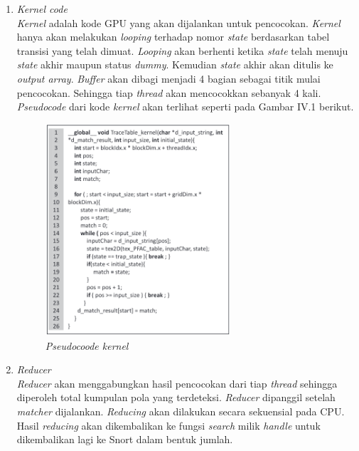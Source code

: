 \begin{enumerate}
      \item
      \emph{Kernel code} \\
      \emph{Kernel} adalah kode GPU yang akan dijalankan untuk pencocokan. \emph{Kernel} hanya akan melakukan \emph{looping} terhadap nomor \emph{state} berdasarkan tabel transisi yang telah dimuat. \emph{Looping} akan berhenti ketika \emph{state} telah menuju \emph{state} akhir maupun status \emph{dummy}. Kemudian \emph{state} akhir akan ditulis ke \emph{output array}. \emph{Buffer} akan dibagi menjadi 4 bagian sebagai titik mulai pencocokan. Sehingga tiap \emph{thread} akan mencocokkan sebanyak 4 kali. \emph{Pseudocode} dari kode \emph{kernel} akan terlihat seperti pada Gambar IV.1 berikut.

      \begin{figure}[htb]
        \centering
        \includegraphics[width=0.65\textwidth]{resources/pseudo.png}
        \caption[\emph{Pseudocoode kernel}]{\emph{Pseudocoode kernel}}
      \end{figure}

      \item
      \emph{Reducer} \\
      \emph{Reducer} akan menggabungkan hasil pencocokan dari tiap \emph{thread} sehingga diperoleh total kumpulan pola yang terdeteksi. \emph{Reducer} dipanggil setelah \emph{matcher} dijalankan. \emph{Reducing} akan dilakukan secara sekuensial pada CPU. Hasil \emph{reducing} akan dikembalikan ke fungsi \emph{search} milik \emph{handle} untuk dikembalikan lagi ke Snort dalam bentuk jumlah.
      
    \end{enumerate}

